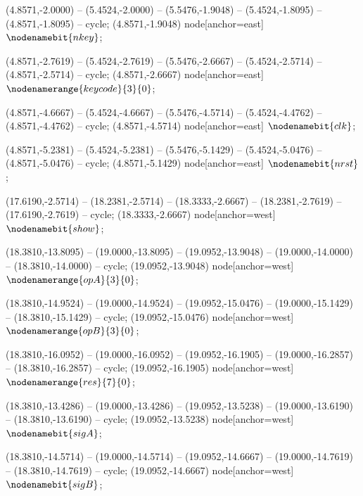    (4.8571,-2.0000) -- (5.4524,-2.0000) -- (5.5476,-1.9048) -- (5.4524,-1.8095) -- (4.8571,-1.8095) -- cycle;
   (4.8571,-1.9048) node[anchor=east] {$\nodenamebit{nkey}$};

   (4.8571,-2.7619) -- (5.4524,-2.7619) -- (5.5476,-2.6667) -- (5.4524,-2.5714) -- (4.8571,-2.5714) -- cycle;
   (4.8571,-2.6667) node[anchor=east] {$\nodenamerange{keycode}{3}{0}$};

   (4.8571,-4.6667) -- (5.4524,-4.6667) -- (5.5476,-4.5714) -- (5.4524,-4.4762) -- (4.8571,-4.4762) -- cycle;
   (4.8571,-4.5714) node[anchor=east] {$\nodenamebit{clk}$};

   (4.8571,-5.2381) -- (5.4524,-5.2381) -- (5.5476,-5.1429) -- (5.4524,-5.0476) -- (4.8571,-5.0476) -- cycle;
   (4.8571,-5.1429) node[anchor=east] {$\nodenamebit{nrst}$};

   (17.6190,-2.5714) -- (18.2381,-2.5714) -- (18.3333,-2.6667) -- (18.2381,-2.7619) -- (17.6190,-2.7619) -- cycle;
   (18.3333,-2.6667) node[anchor=west] {$\nodenamebit{show}$};

   (18.3810,-13.8095) -- (19.0000,-13.8095) -- (19.0952,-13.9048) -- (19.0000,-14.0000) -- (18.3810,-14.0000) -- cycle;
   (19.0952,-13.9048) node[anchor=west] {$\nodenamerange{opA}{3}{0}$};

   (18.3810,-14.9524) -- (19.0000,-14.9524) -- (19.0952,-15.0476) -- (19.0000,-15.1429) -- (18.3810,-15.1429) -- cycle;
   (19.0952,-15.0476) node[anchor=west] {$\nodenamerange{opB}{3}{0}$};

   (18.3810,-16.0952) -- (19.0000,-16.0952) -- (19.0952,-16.1905) -- (19.0000,-16.2857) -- (18.3810,-16.2857) -- cycle;
   (19.0952,-16.1905) node[anchor=west] {$\nodenamerange{res}{7}{0}$};

   (18.3810,-13.4286) -- (19.0000,-13.4286) -- (19.0952,-13.5238) -- (19.0000,-13.6190) -- (18.3810,-13.6190) -- cycle;
   (19.0952,-13.5238) node[anchor=west] {$\nodenamebit{sigA}$};

   (18.3810,-14.5714) -- (19.0000,-14.5714) -- (19.0952,-14.6667) -- (19.0000,-14.7619) -- (18.3810,-14.7619) -- cycle;
   (19.0952,-14.6667) node[anchor=west] {$\nodenamebit{sigB}$};


